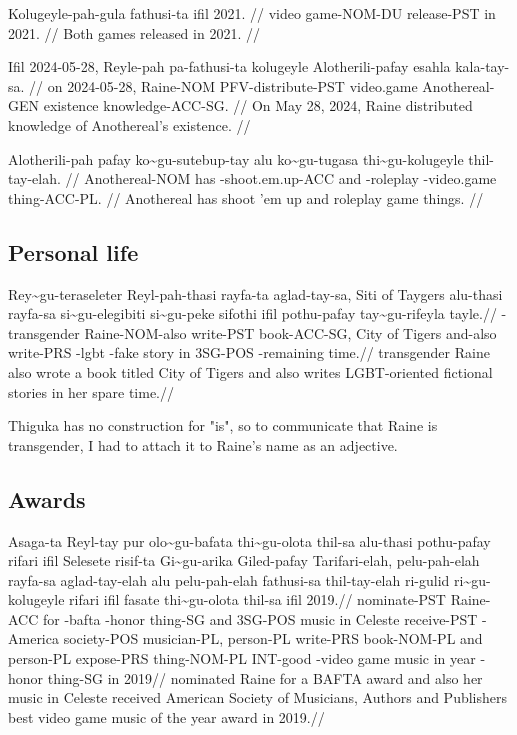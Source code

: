 \ex
\begingl
\gla Kolugeyle-pah-gula fathusi-ta ifil 2021. //
\glb video game-NOM-DU release-PST in 2021. //
\glft Both games released in 2021. //
\endgl
\xe

\ex
\begingl
\gla Ifil 2024-05-28, Reyle-pah pa-fathusi-ta kolugeyle Alotherili-pafay esahla kala-tay-sa. //
\glb on 2024-05-28, Raine-NOM PFV-distribute-PST video.game Anothereal-GEN existence knowledge-ACC-SG. //
\glft On May 28, 2024, Raine distributed knowledge of Anothereal's existence. //
\endgl
\xe

\ex
\begingl
\gla Alotherili-pah pafay ko\~{}gu-sutebup-tay alu ko\~{}gu-tugasa thi\~{}gu-kolugeyle thil-tay-elah. //
\glb Anothereal-NOM has \agradj-shoot.em.up-ACC and \agradj-roleplay \agradj-video.game thing-ACC-PL. //
\glft Anothereal has shoot 'em up and roleplay game things. //
\endgl
\xe

\subsection{Personal life}

\ex
\begingl
\gla  Rey\~{}gu-teraseleter Reyl-pah-thasi rayfa-ta aglad-tay-sa, Siti of Taygers alu-thasi rayfa-sa si\~{}gu-elegibiti si\~{}gu-peke sifothi ifil pothu-pafay tay\~{}gu-rifeyla tayle.//
\glb  \agradj-transgender Raine-NOM-also write-PST book-ACC-SG,  City of Tigers and-also write-PRS \agradj-lgbt \agradj-fake story in 3SG-POS \agradj-remaining time.//
\glft transgender Raine also wrote a book titled City of Tigers and also writes LGBT-oriented fictional stories in her spare time.//
\endgl
\xe

Thiguka has no construction for "is", so to communicate that Raine is transgender, I had to attach it to Raine's name as an adjective.

\subsection{Awards}

\ex
\begingl
\gla  Asaga-ta Reyl-tay pur olo\~{}gu-bafata thi\~{}gu-olota thil-sa alu-thasi pothu-pafay rifari ifil Selesete risif-ta Gi\~{}gu-arika Giled-pafay Tarifari-elah, pelu-pah-elah rayfa-sa aglad-tay-elah alu pelu-pah-elah fathusi-sa thil-tay-elah ri-gulid ri\~{}gu-kolugeyle rifari ifil fasate thi\~{}gu-olota thil-sa ifil 2019.//
\glb  nominate-PST Raine-ACC for \agradj-bafta \agradj-honor thing-SG and 3SG-POS music in Celeste receive-PST \agradj-America society-POS  musician-PL, person-PL write-PRS book-NOM-PL and person-PL expose-PRS thing-NOM-PL INT-good \agradj-video game music in year \agradj-honor thing-SG in 2019//
\glft nominated Raine for a BAFTA award and also her music in Celeste received American Society of Musicians, Authors and Publishers best video game music of the year award in 2019.//
\endgl
\xe

